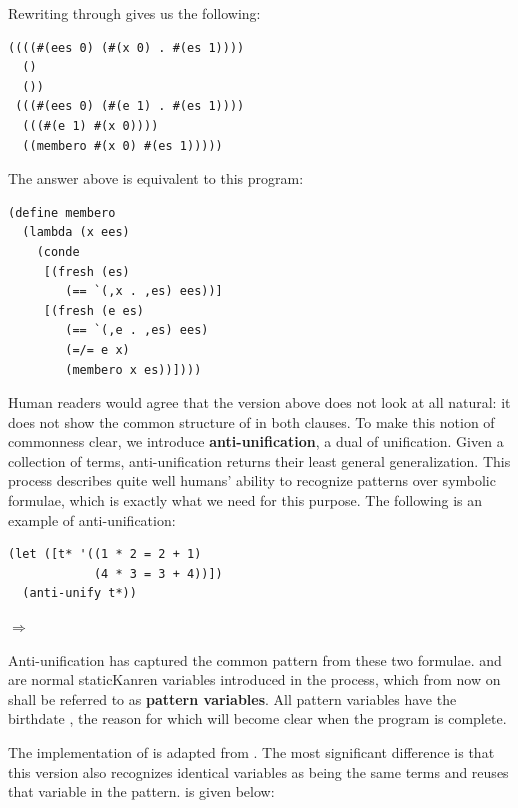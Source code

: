 Rewriting through  gives us the following:
\begin{lstlisting}
((((#(ees 0) (#(x 0) . #(es 1)))) 
  ()
  ())
 (((#(ees 0) (#(e 1) . #(es 1))))
  (((#(e 1) #(x 0))))
  ((membero #(x 0) #(es 1)))))
\end{lstlisting}
The answer above is equivalent to this program:
\begin{lstlisting}
(define membero
  (lambda (x ees)
    (conde
     [(fresh (es)
        (== `(,x . ,es) ees))]
     [(fresh (e es)
        (== `(,e . ,es) ees)
        (=/= e x)
        (membero x es))])))
\end{lstlisting}
Human readers would agree that the version above does not look at all natural: it does not show the common structure of  in both clauses. To make this notion of commonness clear, we introduce \textbf{anti-unification}, a dual of unification. Given a collection of terms, anti-unification returns their least general generalization. This process describes quite well humans' ability to recognize patterns over symbolic formulae, which is exactly what we need for this purpose. The following is an example of anti-unification:
\begin{lstlisting}
(let ([t* '((1 * 2 = 2 + 1)
            (4 * 3 = 3 + 4))])
  (anti-unify t*))
\end{lstlisting}
$\Rightarrow$ 

Anti-unification has captured the common pattern from these two formulae.  and  are normal staticKanren variables introduced in the process, which from now on shall be referred to as \textbf{pattern variables}. All pattern variables have the birthdate , the reason for which will become clear when the program is complete.

The implementation of  is adapted from \textcite{ostvold2004functional}. The most significant difference is that this version also recognizes identical variables as being the same terms and reuses that variable in the pattern.  is given below:

